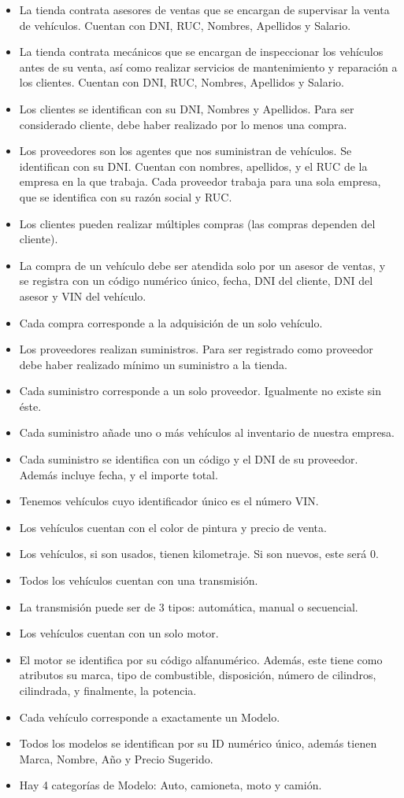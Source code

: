 \documentclass[12pt]{article}
\begin{document}
\begin{itemize}
\item La tienda contrata asesores de ventas que se encargan de supervisar la venta de vehículos. Cuentan con DNI, RUC, Nombres, Apellidos y Salario.
\item La tienda contrata mecánicos que se encargan de inspeccionar los vehículos antes de su venta, así como realizar servicios de mantenimiento y reparación a los clientes. Cuentan con DNI, RUC, Nombres, Apellidos y Salario.
\item Los clientes se identifican con su DNI, Nombres y Apellidos. Para ser considerado cliente, debe haber realizado por lo menos una compra.
\item Los proveedores son los agentes que nos suministran de vehículos. Se identifican con su DNI. Cuentan con nombres, apellidos, y el RUC de la empresa en la que trabaja. Cada proveedor trabaja para una sola empresa, que se identifica con su razón social y RUC.
\item Los clientes pueden realizar múltiples compras (las compras dependen del cliente).
\item La compra de un vehículo debe ser atendida solo por un asesor de ventas, y se registra con un código numérico único, fecha, DNI del cliente, DNI del asesor y VIN del vehículo.
\item Cada compra corresponde a la adquisición de un solo vehículo.
\item Los proveedores realizan suministros. Para ser registrado como proveedor debe haber realizado mínimo un suministro a la tienda.
\item Cada suministro corresponde a un solo proveedor. Igualmente no existe sin éste.
\item Cada suministro añade uno o más vehículos al inventario de nuestra empresa.
\item Cada suministro se identifica con un código y el DNI de su proveedor. Además incluye fecha, y el importe total.
\item Tenemos vehículos cuyo identificador único es el número VIN.
\item Los vehículos cuentan con el color de pintura y precio de venta.
\item Los vehículos, si son usados, tienen kilometraje. Si son nuevos, este será 0.
\item Todos los vehículos cuentan con una transmisión.
\item La transmisión puede ser de 3 tipos: automática, manual o secuencial.
\item Los vehículos cuentan con un solo motor.
\item El motor se identifica por su código alfanumérico. Además, este tiene como atributos su marca, tipo de combustible, disposición, número de cilindros, cilindrada, y finalmente, la potencia.
\item Cada vehículo corresponde a exactamente un Modelo.
\item Todos los modelos se identifican por su ID numérico único, además tienen Marca, Nombre, Año y Precio Sugerido.
\item Hay 4 categorías de Modelo: Auto, camioneta, moto y camión.
\end{itemize}
\end{document}
